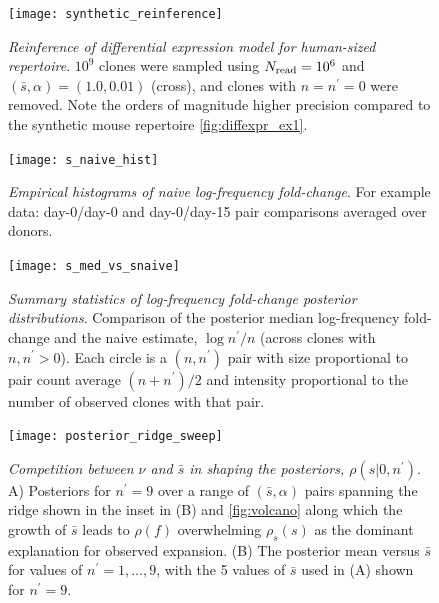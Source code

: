 \begin{figure}
\texttt{[image: synthetic\_reinference]}
\centering{}
\caption{
\emph{Reinference of differential expression model for human-sized repertoire}. $10^9$ clones were sampled using $N_{\rm read}=10^6$ and $(\bar{s},\alpha)=(1.0,0.01)$ (cross), and clones with $n=n^\prime=0$ were removed. Note the orders of magnitude higher precision compared to the synthetic mouse repertoire \cref{fig:diffexpr_ex1}. 
\label{fig:SM_reinf_diffexpr}}
\end{figure}

\begin{figure}
\texttt{[image: s\_naive\_hist]}
\centering{}
\caption{
\emph{Empirical histograms of naive log-frequency fold-change}. For example data: day-0/day-0 and day-0/day-15 pair comparisons averaged over donors.
\label{fig:SM_snaive_hists}
}
\end{figure}

\begin{figure}
\texttt{[image: s\_med\_vs\_snaive]}
\centering{}
\caption{
\emph{Summary statistics of log-frequency fold-change posterior distributions}. Comparison of the posterior median log-frequency fold-change and the naive estimate, $\log n^{\prime}/n$ (across clones with $n,n^{\prime}>0$). Each circle is a $(n,n^\prime)$ pair with size proportional to pair count average $(n+n^\prime)/2$ and intensity proportional to the number of observed clones with that pair.
\label{fig:SM_smed_snaive}
}
\end{figure}

\begin{figure}
\texttt{[image: posterior\_ridge\_sweep]}

\caption{
\emph{Competition between $\nu$ and $\bar{s}$ in shaping the posteriors, $\rho(s|0,n^\prime)$}. A) Posteriors for $n^\prime=9$ over a range of $(\bar{s},\alpha)$ pairs spanning the ridge shown in the inset in (B) and \cref{fig:volcano} along which the growth of $\bar{s}$ leads to $\rho(f)$ overwhelming $\rho_s(s)$ as the dominant explanation for observed expansion. (B) The posterior mean versus $\bar{s}$ for values of $n^\prime=1,\dots,9$, with the 5 values of $\bar{s}$ used in (A) shown for $n^\prime=9$.
\label{fig:posteriors}}
\end{figure}